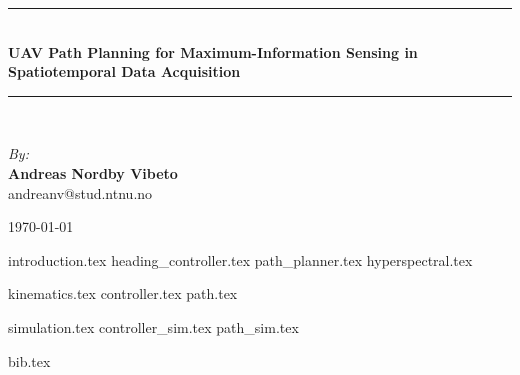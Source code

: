 \documentclass{article}
\newcommand{\HRule}{\rule{\linewidth}{0.5mm}}
\numberwithin{equation}{section}
\begin{document}
\begin{center}
\HRule \\[0.4cm]
{ \huge \bfseries UAV Path Planning for Maximum-Information Sensing in Spatiotemporal Data Acquisition}
\HRule \\[1.5cm]

\begin{center} \large
\emph{By:}\\
\textbf{Andreas Nordby Vibeto}\\
andreanv@stud.ntnu.no
\end{center}

\vfill

{\large \monthyear\today}

\end{center}
\newpage

\tableofcontents

\newpage


{introduction.tex}
{heading_controller.tex}
{path_planner.tex}
{hyperspectral.tex}

{kinematics.tex}
{controller.tex}
{path.tex}

{simulation.tex}
{controller_sim.tex}
{path_sim.tex}


\newpage
{bib.tex}
\end{document}

